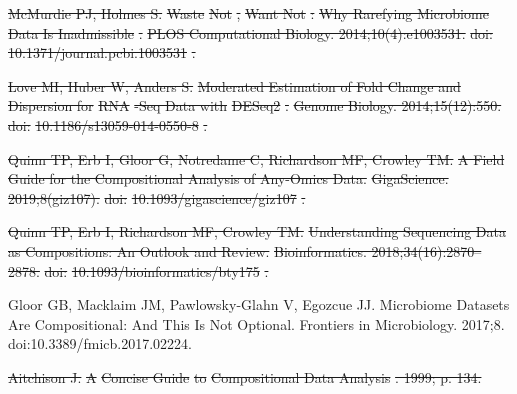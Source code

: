 \documentclass[10pt,letterpaper]{article}
\providecommand{\DIFdeltex}[1]{{\protect\color{red}\sout{#1}}}                      %
\providecommand{\DIFdelbegin}{} %
\providecommand{\DIFdelend}{} %
\providecommand{\DIFdel}[1]{\texorpdfstring{\DIFdeltex{#1}}{}} %
\newcommand{\DIFscaledelfig}{0.5}
\newlength{\DIFdelgraphicswidth} %
\newlength{\DIFdelgraphicsheight} %
\newcommand{\DIFdelincludegraphics}[2][]{%
\sbox{\DIFdelgraphicsbox}{\DIFOincludegraphics[#1]{#2}}%
\settoboxwidth{\DIFdelgraphicswidth}{\DIFdelgraphicsbox} %
\settoboxtotalheight{\DIFdelgraphicsheight}{\DIFdelgraphicsbox} %
\scalebox{\DIFscaledelfig}{%
\parbox[b]{\DIFdelgraphicswidth}{\usebox{\DIFdelgraphicsbox}\\[-\baselineskip] \rule{\DIFdelgraphicswidth}{0em}}\llap{\resizebox{\DIFdelgraphicswidth}{\DIFdelgraphicsheight}{%
\setlength{\unitlength}{\DIFdelgraphicswidth}%
\begin{picture}(1,1)%
\thicklines\linethickness{2pt} %
{\color[rgb]{1,0,0}\put(0,0){\framebox(1,1){}}}%
{\color[rgb]{1,0,0}\put(0,0){\line( 1,1){1}}}%
{\color[rgb]{1,0,0}\put(0,1){\line(1,-1){1}}}%
\end{picture}%
}\hspace*{3pt}}} %
} %
\DeclareRobustCommand{\DIFdelbegin}{\DIFOdelbegin \let\includegraphics\DIFdelincludegraphics} %
\DeclareRobustCommand{\DIFdelend}{\DIFOaddend \let\includegraphics\DIFOincludegraphics} %
\begin{document}
\begin{thebibliography}{10}
\DIFdel{McMurdie PJ, Holmes S.
}%
\DIFdel{Waste }%
\DIFdel{Not}%
\DIFdel{, }%
\DIFdel{Want Not}%
\DIFdel{: }%
\DIFdel{Why Rarefying Microbiome Data Is
  Inadmissible}%
\DIFdel{.
}%
\DIFdel{PLOS Computational Biology. 2014;10(4):e1003531.
}%
\DIFdel{doi:}%
\DIFdel{10.1371/journal.pcbi.1003531}%
\DIFdel{.
}%

\DIFdel{Love MI, Huber W, Anders S.
}%
\DIFdel{Moderated Estimation of Fold Change and Dispersion for }%
\DIFdel{RNA}%
\DIFdel{-Seq
  Data with }%
\DIFdel{DESeq2}%
\DIFdel{.
}%
\DIFdel{Genome Biology. 2014;15(12):550.
}%
\DIFdel{doi:}%
\DIFdel{10.1186/s13059-014-0550-8}%
\DIFdel{.
}%

\DIFdel{Quinn TP, Erb I, Gloor G, Notredame C, Richardson MF, Crowley TM.
}%
\DIFdel{A Field Guide for the Compositional Analysis of Any-Omics Data.
}%
\DIFdel{GigaScience. 2019;8(giz107).
}%
\DIFdel{doi:}%
\DIFdel{10.1093/gigascience/giz107}%
\DIFdel{.
}%

\DIFdel{Quinn TP, Erb I, Richardson MF, Crowley TM.
}%
\DIFdel{Understanding Sequencing Data as Compositions: An Outlook and Review.
}%
\DIFdel{Bioinformatics. 2018;34(16):2870--2878.
}%
\DIFdel{doi:}%
\DIFdel{10.1093/bioinformatics/bty175}%
\DIFdel{.
}%

\DIFdelend {}
Gloor GB, Macklaim JM, {Pawlowsky-Glahn} V, Egozcue JJ.
\newblock Microbiome {{Datasets Are Compositional}}: {{And This Is Not
  Optional}}.
\newblock Frontiers in Microbiology. 2017;8.
\newblock doi:{10.3389/fmicb.2017.02224}.

\DIFdelbegin {}
\DIFdel{Aitchison J.
}%
\DIFdel{A }%
\DIFdel{Concise Guide}%
\DIFdel{to }%
\DIFdel{Compositional Data Analysis}%
\DIFdel{. 1999; p. 134.
}%


\end{thebibliography}
\end{document}
